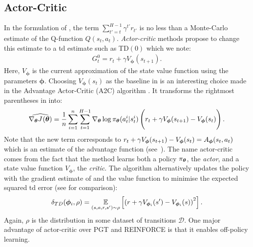 \subsection{Actor-Critic}
In the formulation of , the term $\textstyle\sum\nolimits_{t'=t}^{H-1}\gamma^{t'} r_{t'}$ is no less than a Monte-Carlo estimate of the Q-function $Q(s_t,a_t)$. 
\emph{Actor-critic} methods propose to change this estimate to a \gls{td} estimate such as TD$(0)$ which we note:
\begin{align*}
    G_{t}^0 = r_{t} + \gamma V_{\boldsymbol\phi}(s_{t+1}).
\end{align*}
Here, $V_{\boldsymbol\phi}$ is the current approximation of the state value function using the parameters $\boldsymbol\phi$.
Choosing $V_{\boldsymbol\phi}(s_{t})$ as the baseline in  is an interesting choice made in the Advantage Actor-Critic (A2C) algorithm \cite{mnih2016asynchronous}. 
It transforms the rightmost parentheses in  into:
\begin{align}
\label{eq:a2c}
    \widehat{\nabla_{\vectorialform{\theta}} \expectedreturn[][](\vectorialform{\theta})} = \frac{1}{n}\sum_{i=1}^{n}\sum_{t=1}^{H-1} \nabla_{\vectorialform{\theta}} \log \pi_{\vectorialform{\theta}}(a_t^i\vert s_t^i)
    \left(\vphantom{\sum_{i=1}^{n}\sum_{t=1}^{H-1}} r_{t} + \gamma V_{\boldsymbol\phi}(s_{t+1}) - V_{\boldsymbol\phi}(s_{t})\right).
\end{align}
Note that the new term corresponds to $r_{t} + \gamma V_{\boldsymbol\phi}(s_{t+1}) - V_{\boldsymbol\phi}(s_{t})=A_{\boldsymbol\phi}(s_t,a_t)$ which is an estimate of the advantage function (see~).
The name actor-critic comes from the fact that the method learns both a policy $\pi_{{\boldsymbol{\theta}}}$, the \emph{actor}, and a state value function $V_{\boldsymbol\phi}$, the \emph{critic}. 
The algorithm alternatively updates the policy with the gradient estimate of  and the value function to minimise the expected squared \gls{td} error (see  for comparison):
\begin{align}
\label{eq:update_a2c}
    \delta_{TD}(\boldsymbol\phi_i,\rho) = \operatorname*{\mathbb{E}}_{(s,a,r,s')\sim\rho}\left[\left(r+\gamma V_{\boldsymbol\phi_i}(s') - V_{\boldsymbol\phi_{i}}(s)\right)^2\right].
\end{align}
Again, $\rho$ is the distribution in some dataset of transitions $\mathcal D$.
One major advantage of actor-critic over PGT and REINFORCE is that it enables off-policy learning.


